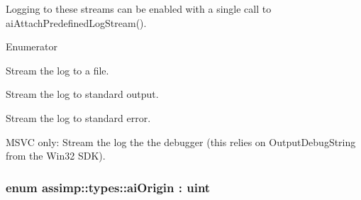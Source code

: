 Logging to these streams can be enabled with a single call to {\ttfamily ai\+Attach\+Predefined\+Log\+Stream()}. \begin{Desc}
\item[Enumerator]\par
\begin{description}
\item[{\em 
\hypertarget{namespaceassimp_1_1types_a52da3a6c31d2b1f04a0f897a22c5b3a6a0635dd4225361cb6b8db05572f6e3d23}{F\+I\+L\+E}\label{namespaceassimp_1_1types_a52da3a6c31d2b1f04a0f897a22c5b3a6a0635dd4225361cb6b8db05572f6e3d23}
}]Stream the log to a file. \item[{\em 
\hypertarget{namespaceassimp_1_1types_a52da3a6c31d2b1f04a0f897a22c5b3a6ab0f5987ab9641a174102f2d90e5213b7}{S\+T\+D\+O\+U\+T}\label{namespaceassimp_1_1types_a52da3a6c31d2b1f04a0f897a22c5b3a6ab0f5987ab9641a174102f2d90e5213b7}
}]Stream the log to standard output. \item[{\em 
\hypertarget{namespaceassimp_1_1types_a52da3a6c31d2b1f04a0f897a22c5b3a6a317b738737505e13bda6af6daf11b36c}{S\+T\+D\+E\+R\+R}\label{namespaceassimp_1_1types_a52da3a6c31d2b1f04a0f897a22c5b3a6a317b738737505e13bda6af6daf11b36c}
}]Stream the log to standard error. \item[{\em 
\hypertarget{namespaceassimp_1_1types_a52da3a6c31d2b1f04a0f897a22c5b3a6a44c930f831ee861d3c59cea7d0fe2d08}{D\+E\+B\+U\+G\+G\+E\+R}\label{namespaceassimp_1_1types_a52da3a6c31d2b1f04a0f897a22c5b3a6a44c930f831ee861d3c59cea7d0fe2d08}
}]M\+S\+V\+C only\+: Stream the log the the debugger (this relies on {\ttfamily Output\+Debug\+String} from the Win32 S\+D\+K). \end{description}
\end{Desc}
\hypertarget{namespaceassimp_1_1types_a1fe9ed8ac4719b58cb780da43ff011e2}{
\subsubsection[{ai\+Origin}]{\setlength{\rightskip}{0pt plus 5cm}enum assimp\+::types\+::ai\+Origin \+: uint}}\label{namespaceassimp_1_1types_a1fe9ed8ac4719b58cb780da43ff011e2}
